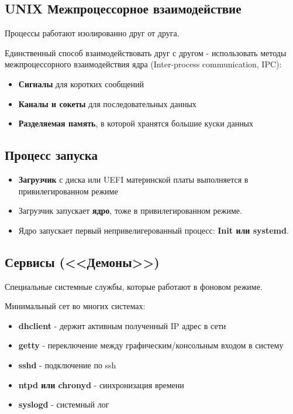 \subsection{UNIX Межпроцессорное взаимодействие}

Процессы работают изолированно друг от друга.

Единственный способ взаимодействовать друг с другом - использовать методы межпроцессорного взаимодействия ядра (Inter-process communication, IPC):
\begin{itemize}
	\item \textbf{Сигналы} для коротких сообщений
	\item \textbf{Каналы и сокеты} для последовательных данных
	\item \textbf{Разделяемая память}, в которой хранятся большие куски данных
\end{itemize}

\subsection{Процесс запуска}

\begin{itemize}
	\item \textbf{Загрузчик} с диска или UEFI материнской платы выполняется в привилегированном режиме
	\item Загрузчик запускает \textbf{ядро}, тоже в привилегированном режиме.
	\item Ядро запускает первый непривелигерованный процесс: \textbf{Init или systemd}.
\end{itemize}

\subsection{Сервисы (<<Демоны>>)}

Специальные системные службы, которые работают в фоновом режиме.

Минимальный сет во многих системах:
\begin{itemize}
	\item \textbf{dhclient} - держит активным полученный IP адрес в сети
	\item \textbf{getty} - переключение между графическим/консольным входом в систему
	\item \textbf{sshd} - подключение по ssh
	\item \textbf{ntpd или chronyd} - синхронизация времени
	\item \textbf{syslogd} - системный лог
\end{itemize}


